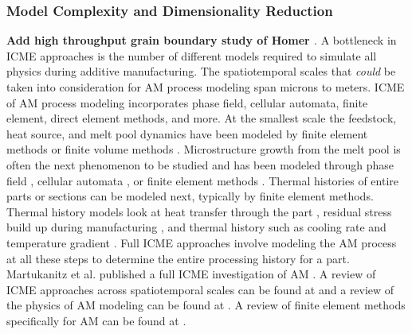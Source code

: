 \subsubsection{Model Complexity and Dimensionality Reduction}
\textbf{Add high throughput grain boundary study of Homer \cite{Homer2019}}. 
A bottleneck in ICME approaches is the number of different models required to simulate all physics during additive manufacturing. The spatiotemporal scales that \textit{could} be taken into consideration for AM process modeling span microns to meters. ICME of AM process modeling incorporates phase field, cellular automata, finite element, direct element methods, and more. At the smallest scale the feedstock, heat source, and melt pool dynamics have been modeled by finite element methods \cite{Toyserkani2004, Khairallah2016, Manvatkar2014} or finite  volume methods \cite{Dai2014}. Microstructure growth from the melt pool is often the next phenomenon to be studied and has been modeled through phase field \cite{Chen2002, Gong2015, Kundin2015, Sahoo2016}, cellular automata \cite{Tan2011}, or finite element methods \cite{Nie2014}. Thermal histories of entire parts or sections can be modeled next, typically by finite element methods. Thermal history models look at heat transfer through the part \cite{Michaleris2014}, residual stress build up during manufacturing \cite{Pal2014, Ding2011}, and thermal history such as cooling rate and temperature gradient \cite{Li2014, Raghavan2016}. Full ICME approaches involve modeling the AM process at all these steps to determine the entire processing history for a part. Martukanitz et al. published a full ICME investigation of AM \cite{Martukanitz2014}. A review of ICME approaches across spatiotemporal scales can be found at \cite{Francois2017} and a review of the physics of AM modeling can be found at \cite{King2015a}. A review of finite element methods specifically for AM can be found at \cite{Gouge2018}. 

